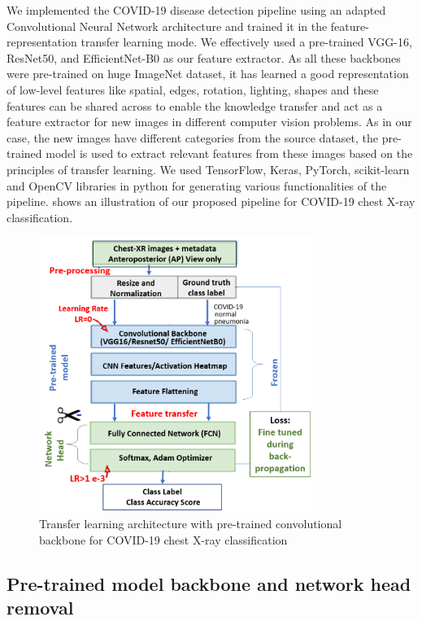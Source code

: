 We implemented the COVID-19 disease detection pipeline using an adapted Convolutional Neural Network architecture and trained it in the feature-representation transfer learning mode. We effectively used a pre-trained  VGG-16, ResNet50, and EfficientNet-B0 as our feature extractor. As all these backbones were pre-trained on huge ImageNet dataset, it has learned a good representation of low-level features like spatial, edges, rotation, lighting, shapes and these features can be shared across to enable the knowledge transfer and act as a feature extractor for new images in different computer vision problems.  As in our case, the new images have different categories from the source dataset, the pre-trained model is used to extract relevant features from these images based on the principles of transfer learning. We used TensorFlow, Keras, PyTorch, scikit-learn and OpenCV libraries in python for generating various functionalities of the pipeline.  shows an illustration of our proposed pipeline for COVID-19 chest X-ray classification.
\begin{figure}
\centering
\includegraphics[width=0.79\textwidth]{images/Architecture_covid19.png}
   \caption{Transfer learning architecture with pre-trained convolutional backbone for COVID-19 chest X-ray classification}
\label{fig:architecture}

\end{figure}

 \subsection{Pre-trained model backbone and network head removal}

